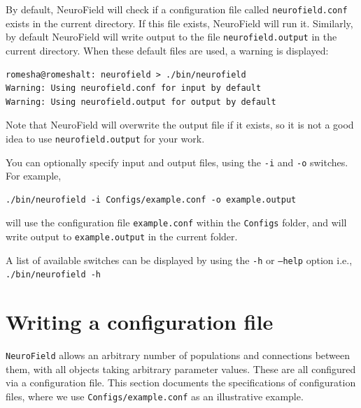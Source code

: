 \documentclass[12pt,a4paper]{article}
\newcommand{\type}[1]{ {\small\small\tt #1} }
\newcommand{\NF}[0]{ \type{NeuroField}}
\begin{document}
By default, NeuroField will check if a configuration file called \type{neurofield.conf} exists in the current directory. If this file exists, NeuroField will run it. Similarly, by default NeuroField will write output to the file \type{neurofield.output} in the current directory. When these default files are used, a warning is displayed:

\begin{lstlisting}
romesha@romeshalt: neurofield > ./bin/neurofield
Warning: Using neurofield.conf for input by default
Warning: Using neurofield.output for output by default
\end{lstlisting}

Note that NeuroField will overwrite the output file if it exists, so it is not a good idea to use \type{neurofield.output} for your work.

You can optionally specify input and output files, using the \type{-i} and \type{-o} switches. For example,

\begin{lstlisting}
./bin/neurofield -i Configs/example.conf -o example.output
\end{lstlisting}

will use the configuration file \type{example.conf} within the \type{Configs} folder, and will write output to \type{example.output} in the current folder.

A list of available switches can be displayed by using the \type{-h} or \type{--help} option i.e., \type{./bin/neurofield -h}

\section{Writing a configuration file}
\label{sec:config}

\NF allows an arbitrary number of populations and connections between them, with all objects taking arbitrary parameter values. These are all configured via a configuration file. This section documents the specifications of configuration files, where we use \type{Configs/example.conf} as an illustrative example.
\end{document}
